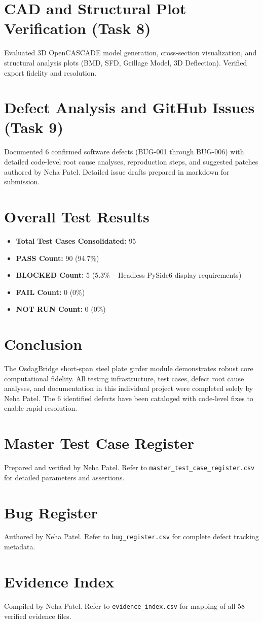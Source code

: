 \documentclass[11pt,a4paper]{report}
\begin{document}
\chapter{CAD and Structural Plot Verification (Task 8)}
Evaluated 3D OpenCASCADE model generation, cross-section visualization, and structural analysis plots (BMD, SFD, Grillage Model, 3D Deflection). Verified export fidelity and resolution.

\chapter{Defect Analysis and GitHub Issues (Task 9)}
Documented 6 confirmed software defects (BUG-001 through BUG-006) with detailed code-level root cause analyses, reproduction steps, and suggested patches authored by Neha Patel. Detailed issue drafts prepared in markdown for submission.

\chapter{Overall Test Results}
\begin{itemize}
    \item \textbf{Total Test Cases Consolidated:} 95
    \item \textbf{PASS Count:} 90 (94.7\%)
    \item \textbf{BLOCKED Count:} 5 (5.3\% -- Headless PySide6 display requirements)
    \item \textbf{FAIL Count:} 0 (0\%)
    \item \textbf{NOT RUN Count:} 0 (0\%)
\end{itemize}

\chapter{Conclusion}
The OsdagBridge short-span steel plate girder module demonstrates robust core computational fidelity. All testing infrastructure, test cases, defect root cause analyses, and documentation in this individual project were completed solely by Neha Patel. The 6 identified defects have been cataloged with code-level fixes to enable rapid resolution.

\appendix
\chapter{Master Test Case Register}
Prepared and verified by Neha Patel. Refer to \texttt{master\_test_case_register.csv} for detailed parameters and assertions.

\chapter{Bug Register}
Authored by Neha Patel. Refer to \texttt{bug_register.csv} for complete defect tracking metadata.

\chapter{Evidence Index}
Compiled by Neha Patel. Refer to \texttt{evidence_index.csv} for mapping of all 58 verified evidence files.
\end{document}
